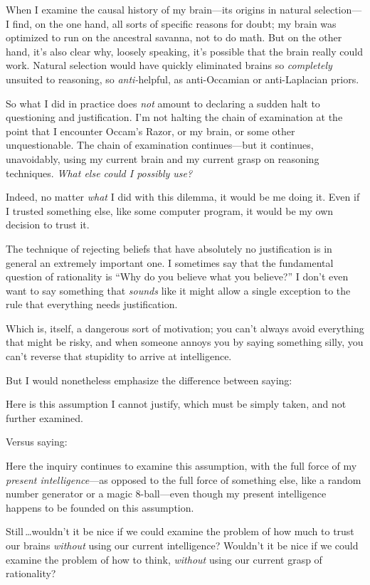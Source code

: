  When I examine the causal history of my brain---its origins in
natural selection---I find, on the one hand, all sorts of specific
reasons for doubt; my brain was optimized to run on the ancestral
savanna, not to do math. But on the other hand, it's
also clear why, loosely speaking, it's possible that
the brain really could work. Natural selection would have quickly
eliminated brains so \textit{completely} unsuited to reasoning, so
\textit{anti-}helpful, as anti-Occamian or anti-Laplacian priors.


 So what I did in practice does \textit{not} amount to declaring a
sudden halt to questioning and justification. I'm not
halting the chain of examination at the point that I encounter
Occam's Razor, or my brain, or some other
unquestionable. The chain of examination continues---but it continues,
unavoidably, using my current brain and my current grasp on reasoning
techniques. \textit{What else could I possibly use?}


 Indeed, no matter \textit{what} I did with this dilemma, it would
be me doing it. Even if I trusted something else, like some computer
program, it would be my own decision to trust it.


 The technique of rejecting beliefs that have absolutely no
justification is in general an extremely important one. I sometimes say
that the fundamental question of rationality is ``Why
do you believe what you believe?'' I
don't even want to say something that \textit{sounds}
like it might allow a single exception to the rule that everything
needs justification.


 Which is, itself, a dangerous sort of motivation; you
can't always avoid everything that might be risky, and
when someone annoys you by saying something silly, you
can't reverse that stupidity to arrive at
intelligence.


 But I would nonetheless emphasize the difference between saying:


 Here is this assumption I cannot justify, which must be simply
taken, and not further examined.


 Versus saying:


 Here the inquiry continues to examine this assumption, with the
full force of my \textit{present intelligence}{}---as opposed to the
full force of something else, like a random number generator or a magic
8-ball---even though my present intelligence happens to be founded on
this assumption.


 Still\,\ldots wouldn't it be nice if we could
examine the problem of how much to trust our brains \textit{without}
using our current intelligence? Wouldn't it be nice if
we could examine the problem of how to think, \textit{without} using
our current grasp of rationality?


